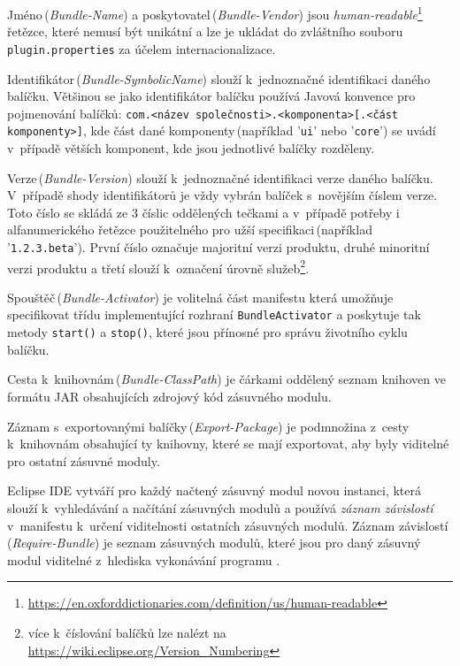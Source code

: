       Jméno\,(\emph{Bundle-Name}) a poskytovatel\,(\emph{Bundle-Vendor}) jsou \emph{human-readable}\footnote{\url{https://en.oxforddictionaries.com/definition/us/human-readable}} řetězce, které nemusí být unikátní a lze je ukládat do zvláštního souboru \texttt{plugin.properties} za účelem internacionalizace.

      Identifikátor\,(\emph{Bundle-SymbolicName}) slouží k~jednoznačné identifikaci daného balíčku. Většinou se jako identifikátor balíčku používá Javová konvence pro pojmenování balíčků: \texttt{com.<název společnosti>.<komponenta>[.<část komponenty>]}, kde část dané komponenty\,(například '\texttt{ui}' nebo '\texttt{core}') se uvádí v~případě větších komponent, kde jsou jednotlivé balíčky rozděleny.

      Verze\,(\emph{Bundle-Version}) slouží k~jednoznačné identifikaci verze daného balíčku. V~případě shody identifikátorů je vždy vybrán balíček s~novějším číslem verze. Toto číslo se skládá ze 3 číslic oddělených tečkami a v~případě potřeby i alfanumerického řetězce použitelného pro užší specifikaci\,(například '\texttt{1.2.3.beta}'). První číslo označuje majoritní verzi produktu, druhé minoritní verzi produktu a třetí slouží k~označení úrovně služeb\footnote{více k~číslování balíčků lze nalézt na \url{https://wiki.eclipse.org/Version_Numbering}}.

      Spouštěč\,(\emph{Bundle-Activator}) je volitelná část manifestu která umožňuje specifikovat třídu implementující rozhraní \texttt{BundleActivator} a poskytuje tak metody \texttt{start()} a \texttt{stop()}, které jsou přínosné pro správu životního cyklu balíčku.

      Cesta k~knihovnám\,(\emph{Bundle-ClassPath}) je čárkami oddělený seznam knihoven ve formátu JAR obsahujících zdrojový kód zásuvného modulu.

      Záznam s~exportovanými balíčky\,(\emph{Export-Package}) je podmnožina z~cesty k~knihovnám obsahující ty knihovny, které se mají exportovat, aby byly viditelné pro ostatní zásuvné moduly.

      Eclipse IDE vytváří pro každý načtený zásuvný modul novou instanci, která slouží k~vyhledávání a načítání zásuvných modulů a používá \emph{záznam závislostí} v~manifestu k~určení viditelnosti ostatních zásuvných modulů. Záznam závislostí\,(\emph{Require-Bundle}) je seznam zásuvných modulů, které jsou pro daný zásuvný modul viditelné z~hlediska vykonávání programu \cite{Plugins}.

